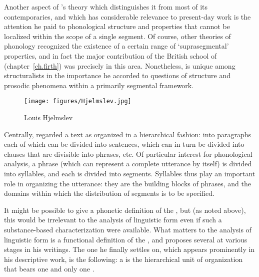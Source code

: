 Another aspect of {\Hjelmslev}'s theory which distinguishes it from most
of its contemporaries, and which has considerable relevance to
present-day work is the attention he paid to phonological structure
and properties that cannot be localized within the scope of a single
segment. Of course, other theories of phonology recognized the
existence of a certain range of `suprasegmental' properties, and in
fact the major contribution of the British school of 
(chapter~\ref{ch.firth}) was precisely in this area. Nonetheless,
{\Hjelmslev} is unique among structuralists in the importance he accorded
to questions of  structure and prosodic phenomena within a
primarily segmental framework.

\begin{wrapfigure}{l}{.35\textwidth}
  \texttt{[image: figures/Hjelmslev.jpg]}
  \caption{Louis Hjelmslev}
  \label{fig:ch.hjelmslev.hjelmslev}
\end{wrapfigure}
Centrally, {\Hjelmslev} regarded a text as organized in a hierarchical fashion: into
paragraphs each of which can be divided into sentences, which can in
turn be divided into clauses that are divisible into phrases, etc. Of
particular interest for phonological analysis, a phrase (which can
represent a complete utterance by itself) is divided into syllables,
and each  is divided into segments. Syllables thus play an
important role in organizing the utterance: they are the building
blocks of phrases, and the domains within which the distribution of
segments is to be specified.

It might be possible to give a phonetic definition of the ,
but (as noted above), this would be irrelevant to the analysis of
linguistic form even if such a substance-based characterization were
available. What matters to the analysis of linguistic form is a
functional definition of the , and {\Hjelmslev} proposes several
at various stages in his writings. The one he finally settles on,
which appears prominently in his descriptive work, is the following: a
 is the hierarchical unit of organization that bears one and
only one .

